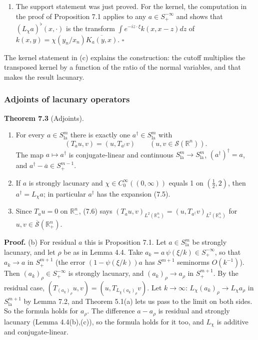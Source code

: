 \documentclass[
  11pt,
]{article}
\providecommand{\tightlist}{%
  \setlength{\itemsep}{0pt}\setlength{\parskip}{0pt}}
\begin{document}
\begin{enumerate}
\def\labelenumi{(\alph{enumi})}
\setcounter{enumi}{2}
\tightlist
\item
  The support statement was just proved. For the kernel, the computation
  in the proof of Proposition 7.1 applies to any \(a\in S^{-\infty}_+\)
  and shows that \((L_\chi a)^\flat(x,\cdot)\) is the transform
  \(\int e^{-iz\cdot\xi}k(x,x-z)dz\) of
  \(k(x,y)=\chi(y_n/x_n)\overline{K_a(y,x)}\). \(\square\)
\end{enumerate}

The kernel statement in (c) explains the construction: the cutoff
multiplies the transposed kernel by a function of the ratio of the
normal variables, and that makes the result lacunary.

\subsubsection{Adjoints of lacunary
operators}\label{adjoints-of-lacunary-operators}

\textbf{Theorem 7.3} (Adjoints).

\begin{enumerate}
\def\labelenumi{(\alph{enumi})}
\item
  For every \(a\in S^m_{\mathrm{la}}\) there is exactly one
  \(a^\dagger\in S^m_{\mathrm{la}}\) with \[
(T_au,v)=(u,T_{a^\dagger}v)\qquad(u,v\in\mathcal S(\mathbb R^n)).
\tag{7.6}
\] The map \(a\mapsto a^\dagger\) is conjugate-linear and continuous
  \(S^m_{\mathrm{la}}\to S^m_{\mathrm{la}}\), \((a^\dagger)^\dagger=a\),
  and \(a^\dagger-\overline a\in S^{m-1}_+\).
\item
  If \(a\) is strongly lacunary and \(\chi\in C_0^\infty((0,\infty))\)
  equals 1 on \((\tfrac12,2)\), then \(a^\dagger=L_\chi a\); in
  particular \(a^\dagger\) has the expansion (7.5).
\item
  Since \(T_au=0\) on \(\mathbb R^n_-\), (7.6) says
  \((T_au,v)_{L^2(\mathbb R^n_+)}=(u,T_{a^\dagger}v)_{L^2(\mathbb R^n_+)}\)
  for \(u,v\in\overline{\mathcal S}(\mathbb R^n_+)\).
\end{enumerate}

\textbf{Proof.} (b) For residual \(a\) this is Proposition 7.1. Let
\(a\in S^m_{\mathrm{la}}\) be strongly lacunary, and let \(\rho\) be as
in Lemma 4.4. Take \(a_k=a\,\psi(\xi/k)\in S^{-\infty}_+\), so that
\(a_k\to a\) in \(S^{m+1}_+\) (the error \((1-\psi(\xi/k))a\) has
\(S^{m+1}\) seminorms \(O(k^{-1})\)). Then
\((a_k)_\rho\in S^{-\infty}_+\) is strongly lacunary, and
\((a_k)_\rho\to a_\rho\) in \(S^{m+1}_+\). By the residual case,
\((T_{(a_k)_\rho}u,v)=(u,T_{L_\chi(a_k)_\rho}v)\). Let \(k\to\infty\):
\(L_\chi(a_k)_\rho\to L_\chi a_\rho\) in \(S^{m+1}_{\mathrm{la}}\) by
Lemma 7.2, and Theorem 5.1(a) lets us pass to the limit on both sides.
So the formula holds for \(a_\rho\). The difference \(a-a_\rho\) is
residual and strongly lacunary (Lemma 4.4(b),(c)), so the formula holds
for it too, and \(L_\chi\) is additive and conjugate-linear.
\end{document}
